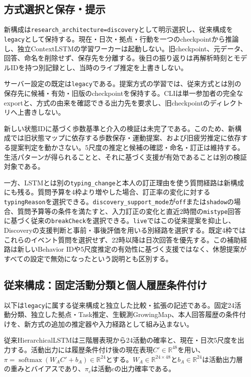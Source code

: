 \subsection{方式選択と保存・提示}
\label{sec:runtime-selection}

新構成は\texttt{research\_architecture=discovery}として明示選択し、従来構成を\texttt{legacy}として保持する。現在・日次・拠点・行動を一つのcheckpointから推論し、独立ContextLSTMの学習ワーカーは起動しない。旧checkpoint、元データ、回答、命名を削除せず、保存先を分離する。後日の振り返りは再解析時刻とモデルIDを持つ別記録とし、当時のライブ推定を上書きしない。

サーバー設定の既定は\texttt{legacy}である。提案方式の学習では、従来方式とは別の保存先に候補・有効・旧版のcheckpointを保持する。CLIは単一参加者の完全なexportと、方式の由来を確認できる出力先を要求し、旧checkpointのディレクトリへ上書きしない。

新しい状態IDに基づく歩数基準と介入の検証は未完了である。このため、新構成では旧状態マップに依存する歩数保存・運動提案、および旧疲労推定に依存する提案判定を動かさない。5尺度の推定と候補の確認・命名・訂正は維持する。生活パターンが得られることと、それに基づく支援が有効であることは別の検証対象である。

一方、LSTMとは別の\texttt{typing\_change}と本人の訂正理由を使う質問経路は新構成にも残る。質問予算を4枠より増やした場合、訂正率の変化に対する\texttt{typingReason}を選択できる。\texttt{discovery\_support\_mode}が\texttt{off}または\texttt{shadow}の場合、質問予算等の条件を満たすと、入力訂正の変化と直近2時間の\texttt{mistype}回答に基づく従来の\texttt{breakCheck}を選択できる。\texttt{live}ではこの従来提案を抑止し、Discoveryの支援判断と事前・事後評価を用いる別経路を選択する。既定4枠ではこれらのイベント質問を選択せず、22時以降は日次回答を優先する。この補助経路は新しいBehavior IDや5尺度推定の有効性に基づく支援ではなく、休憩提案がすべての設定で無効になったという説明とも区別する。

\subsection{従来構成：固定活動分類と個人履歴条件付け}

以下は\texttt{legacy}に属する従来構成と独立した比較・拡張の記述である。固定24活動分類、独立した拠点・Task推定、生観測GrowingMap、本人回答履歴の条件付けを、新方式の追加の推定器や入力経路として組み込まない。

従来HierarchicalLSTMは三階層表現から24活動の確率と、現在・日次5尺度を出力する。活動出力には履歴条件付け後の現在表現\(C'\in\mathbb R^{48}\)を用い、\(\pi=\operatorname{softmax}(W_AC'+b_A)\in\mathbb R^{24}\)とする。\(W_A\in\mathbb R^{24\times48}\)と\(b_A\in\mathbb R^{24}\)は活動出力層の重みとバイアスであり、\(\pi_c\)は活動\(c\)の出力確率である。

